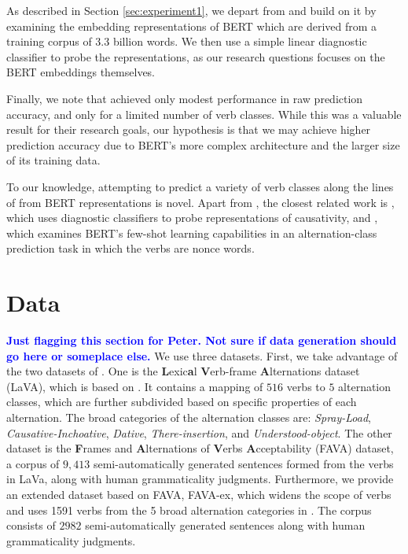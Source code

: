 \documentclass[11pt]{article}
\newcommand{\hey}[1]{\textcolor{blue}{\textbf{#1}}}
\begin{document}
As described in Section \ref{sec:experiment1}, we depart from \citealt{kann-etal-2019-verb} and build on it by examining the embedding representations of BERT which are derived from a training corpus of $3.3$ billion words. We then use a simple linear diagnostic classifier to probe the representations, as our research questions focuses on the BERT embeddings themselves.

Finally, we note that \citet{kann-etal-2019-verb} achieved only modest performance in raw prediction accuracy, and only for a limited number of verb classes.  While this was a valuable result for their research goals, our hypothesis is that we may achieve higher prediction accuracy due to BERT's more complex architecture and the larger size of its training data.

To our knowledge, attempting to predict a variety of verb classes along the lines of \citealt{levin1993} from BERT representations is novel.  Apart from \citealt{kann-etal-2019-verb}, the closest related work is \citealt{causativity-neurons}, which uses diagnostic classifiers to probe representations of causativity, and \citealt{thrush2020investigating}, which examines BERT's few-shot learning capabilities in an alternation-class prediction task in which the verbs are nonce words.


\section{Data}
\label{sec:data}
\hey{Just flagging this section for Peter.  Not sure if data generation should go here or someplace else.}
We use three datasets. First, we take advantage of the two datasets of \citet{kann-etal-2019-verb}.  One is the \textbf{L}exic\textbf{a}l \textbf{V}erb-frame \textbf{A}lternations dataset (LaVA), which is based on \citet{levin1993}.  It contains a mapping of $516$ verbs to $5$ alternation classes, which are further subdivided based on specific properties of each alternation.  The broad categories of the alternation classes are: \emph{Spray-Load}, \emph{Causative-Inchoative}, \emph{Dative}, \emph{There-insertion}, and \emph{Understood-object}.  The other dataset is the \textbf{F}rames and \textbf{A}lternations of \textbf{V}erbs \textbf{A}cceptability (FAVA) dataset, a corpus of $9,413$ semi-automatically generated sentences formed from the verbs in LaVa, along with human grammaticality judgments. Furthermore, we provide an extended dataset based on FAVA, FAVA-ex, which widens the scope of verbs and uses 1591 verbs from the 5 broad alternation categories in \citet{levin1993}. The corpus consists of $2982$ semi-automatically generated sentences along with human grammaticality judgments. 
\end{document}
